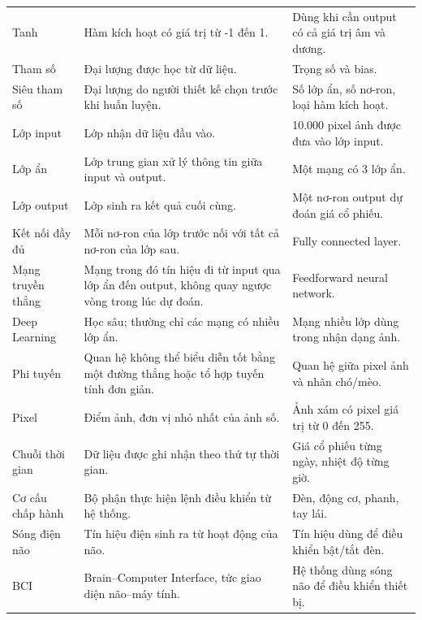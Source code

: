 \begin{longtable}{p{}p{}p{}}
Tanh & Hàm kích hoạt có giá trị từ -1 đến 1. & Dùng khi cần output có cả giá trị âm và dương. \\

Tham số & Đại lượng được học từ dữ liệu. & Trọng số và bias. \\

Siêu tham số & Đại lượng do người thiết kế chọn trước khi huấn luyện. & Số lớp ẩn, số nơ-ron, loại hàm kích hoạt. \\

Lớp input & Lớp nhận dữ liệu đầu vào. & 10.000 pixel ảnh được đưa vào lớp input. \\

Lớp ẩn & Lớp trung gian xử lý thông tin giữa input và output. & Một mạng có 3 lớp ẩn. \\

Lớp output & Lớp sinh ra kết quả cuối cùng. & Một nơ-ron output dự đoán giá cổ phiếu. \\

Kết nối đầy đủ & Mỗi nơ-ron của lớp trước nối với tất cả nơ-ron của lớp sau. & Fully connected layer. \\

Mạng truyền thẳng & Mạng trong đó tín hiệu đi từ input qua lớp ẩn đến output, không quay ngược vòng trong lúc dự đoán. & Feedforward neural network. \\

Deep Learning & Học sâu; thường chỉ các mạng có nhiều lớp ẩn. & Mạng nhiều lớp dùng trong nhận dạng ảnh. \\

Phi tuyến & Quan hệ không thể biểu diễn tốt bằng một đường thẳng hoặc tổ hợp tuyến tính đơn giản. & Quan hệ giữa pixel ảnh và nhãn chó/mèo. \\

Pixel & Điểm ảnh, đơn vị nhỏ nhất của ảnh số. & Ảnh xám có pixel giá trị từ 0 đến 255. \\

Chuỗi thời gian & Dữ liệu được ghi nhận theo thứ tự thời gian. & Giá cổ phiếu từng ngày, nhiệt độ từng giờ. \\

Cơ cấu chấp hành & Bộ phận thực hiện lệnh điều khiển từ hệ thống. & Đèn, động cơ, phanh, tay lái. \\

Sóng điện não & Tín hiệu điện sinh ra từ hoạt động của não. & Tín hiệu dùng để điều khiển bật/tắt đèn. \\

BCI & Brain--Computer Interface, tức giao diện não--máy tính. & Hệ thống dùng sóng não để điều khiển thiết bị. \\

\bottomrule
\end{longtable}
\normalsize

